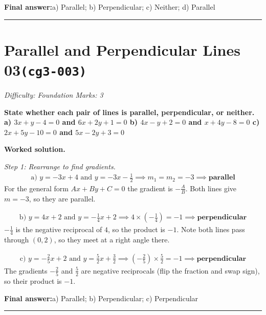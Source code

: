\documentclass[11pt]{article}
\newcommand{\question}[1]{\par\medskip\noindent\textbf{#1}\par}
\begin{document}
\begin{answerbox}
\textbf{Final answer:}\quad a) Parallel; b) Perpendicular; c) Neither; d) Parallel
\end{answerbox}
\medskip\hrule

\section*{Parallel and Perpendicular Lines 03\quad\small\texttt{(cg3-003)}}
\textit{Difficulty: Foundation \quad\textbar\quad Marks: 3}

\question{State whether each pair of lines is parallel, perpendicular, or neither. \\[3pt] a) \( 3x + y - 4 = 0 \) and \( 6x + 2y + 1 = 0 \) b) \( 4x - y + 2 = 0 \) and \( x + 4y - 8 = 0 \) c) \( 2x + 5y - 10 = 0 \) and \( 5x - 2y + 3 = 0 \)}

\textbf{Worked solution.}

\textit{Step 1: Rearrange to find gradients.}
\[\begin{gathered}
\text{a) } y = -3x + 4 \text{ and } y = -3x - \tfrac{1}{2} \implies m_1 = m_2 = -3 \implies \textbf{parallel}
\end{gathered}\]
For the general form \( Ax + By + C = 0 \) the gradient is \( -\tfrac{A}{B} \). Both lines give \( m = -3 \), so they are parallel.

\[\begin{gathered}
\text{b) } y = 4x + 2 \text{ and } y = -\tfrac{1}{4}x + 2 \implies 4 \times (-\tfrac{1}{4}) = -1 \implies \textbf{perpendicular}
\end{gathered}\]
\( -\tfrac{1}{4} \) is the negative reciprocal of \( 4 \), so the product is \( -1 \). Note both lines pass through \( (0, 2) \), so they meet at a right angle there.

\[\begin{gathered}
\text{c) } y = -\tfrac{2}{5}x + 2 \text{ and } y = \tfrac{5}{2}x + \tfrac{3}{2} \implies (-\tfrac{2}{5}) \times \tfrac{5}{2} = -1 \implies \textbf{perpendicular}
\end{gathered}\]
The gradients \( -\tfrac{2}{5} \) and \( \tfrac{5}{2} \) are negative reciprocals (flip the fraction and swap sign), so their product is \( -1 \).

\begin{answerbox}
\textbf{Final answer:}\quad a) Parallel; b) Perpendicular; c) Perpendicular
\end{answerbox}
\medskip\hrule
\end{document}
